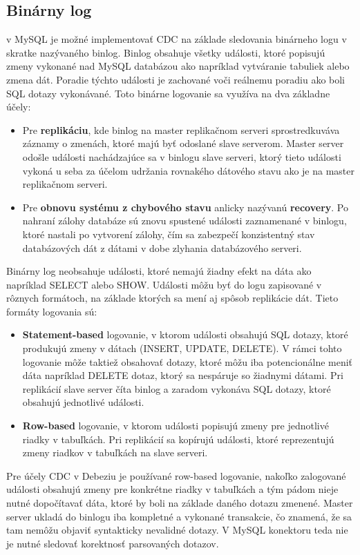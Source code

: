 \subsection{Binárny log} \label{mysql:binlog}
v MySQL je možné implementovať CDC na základe sledovania binárneho logu v skratke nazývaného binlog\cite{mysql:reference_manual}. Binlog obsahuje všetky události, ktoré popisujú zmeny vykonané nad MySQL databázou ako napríklad vytváranie tabuliek alebo zmena dát. Poradie týchto události je zachované voči reálnemu poradiu ako boli SQL dotazy vykonávané. Toto binárne logovanie sa využíva na dva základne účely:
\begin{itemize}
\item Pre \textbf{replikáciu}, kde binlog na master replikačnom serveri sprostredkuváva záznamy o zmenách, ktoré majú byť odoslané slave serverom. Master server odošle události nachádzajúce sa v binlogu slave serveri, ktorý tieto události vykoná u seba za účelom udržania rovnakého dátového stavu ako je na master replikačnom serveri.
\item Pre \textbf{obnovu systému z chybového stavu} anlicky nazývanú \textbf{recovery}. Po  nahraní zálohy databáze sú znovu spustené události zaznamenané v binlogu, ktoré nastali po vytvorení zálohy, čím sa zabezpečí konzistentný stav databázových dát z dátami v dobe zlyhania databázového serveri.
\end{itemize}

Binárny log neobsahuje události, ktoré nemajú žiadny efekt na dáta ako napríklad  SELECT alebo SHOW. Události môžu byť do logu zapisované v rôznych formátoch, na základe ktorých sa mení aj spôsob replikácie dát. Tieto formáty logovania sú:
\begin{itemize}
\item \textbf{Statement-based} logovanie, v ktorom události obsahujú SQL dotazy, ktoré produkujú zmeny v dátach (INSERT, UPDATE, DELETE). V rámci tohto logovanie môže taktiež obsahovať dotazy, ktoré môžu iba potencionálne meniť dáta napríklad DELETE dotaz, ktorý sa nespáruje so žiadnymi dátami. Pri replikácií slave server číta binlog a zaradom vykonáva SQL dotazy, ktoré obsahujú jednotlivé události.
\item \textbf{Row-based} logovanie, v ktorom události popisujú zmeny pre jednotlivé riadky v tabuľkách. Pri replikácií sa kopírujú události, ktoré reprezentujú zmeny riadkov v tabuľkách na slave serveri. 
\end{itemize}

Pre účely CDC v Debeziu je používané row-based logovanie, nakoľko zalogované události obsahujú zmeny pre konkrétne riadky v tabuľkách a tým pádom nieje nutné dopočítavať dáta, ktoré by boli na základe daného dotazu zmenené. Master server ukladá do binlogu iba kompletné a vykonané transakcie, čo znamená, že sa tam nemôžu objaviť syntakticky nevalidné dotazy. V MySQL konektoru teda nie je nutné sledovať korektnosť parsovaných dotazov.


